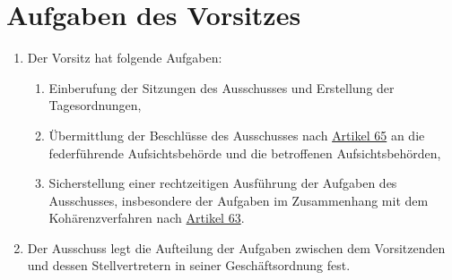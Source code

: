 \chapter{Aufgaben des Vorsitzes}
\label{ch:74}


\begin{enumerate}

  \item Der Vorsitz hat folgende Aufgaben:
  \label{itm:74-1}

  \begin{enumerate}
  
    \item Einberufung der Sitzungen des Ausschusses und Erstellung der Tagesordnungen,
    \label{itm:74-1a}

    \item Übermittlung der Beschlüsse des Ausschusses nach \hyperref[ch:65]{Artikel 65} an die federführende
     Aufsichtsbehörde und die betroffenen Aufsichtsbehörden,
    \label{itm:74-1b}

    \item Sicherstellung einer rechtzeitigen Ausführung der Aufgaben des Ausschusses, insbesondere der Aufgaben im
     Zusammenhang mit dem Kohärenzverfahren nach \hyperref[ch:63]{Artikel 63}.
    \label{itm:74-1c}

  \end{enumerate}

  \item Der Ausschuss legt die Aufteilung der Aufgaben zwischen dem Vorsitzenden und dessen Stellvertretern in seiner
   Geschäftsordnung fest.
  \label{itm:74-2}

\end{enumerate}


